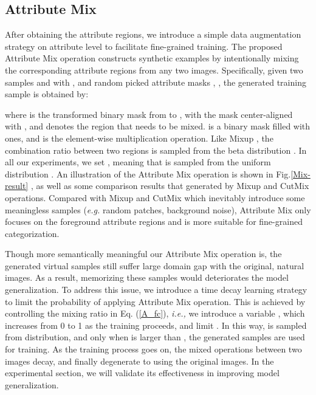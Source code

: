 \documentclass[runningheads]{llncs}
\begin{document}
\subsection{Attribute Mix}
\noindent After obtaining the attribute regions, we introduce a simple data augmentation strategy on attribute level to facilitate fine-grained training. The proposed Attribute Mix operation constructs synthetic examples by intentionally mixing the corresponding attribute regions from any two images. Specifically, given two samples  and  with , and random picked attribute masks , , the generated training sample  is obtained by:


where  is the transformed binary mask from  to , with the mask center-aligned with , and denotes the region that needs to be mixed.  is a binary mask filled with ones, and  is the element-wise multiplication operation. Like Mixup \cite{zhang2017mixup}, the combination ratio  between two regions is sampled from the beta distribution . In all our experiments, we set , meaning that  is sampled from the uniform distribution . An illustration of the Attribute Mix operation is shown in Fig.\ref{Mix-result} , as well as some comparison results that generated by Mixup and CutMix operations. Compared with Mixup and CutMix which inevitably introduce some meaningless samples (\emph{e.g.} random patches, background noise), Attribute Mix only focuses on the foreground attribute regions and is more suitable for fine-grained categorization.

Though more semantically meaningful our Attribute Mix operation is, the generated virtual samples still suffer large domain gap with the original, natural images. As a result, memorizing these samples would deteriorates the model generalization. To address this issue, we introduce a time decay learning strategy to limit the probability of applying Attribute Mix operation. This is achieved by controlling the mixing ratio  in Eq. (\ref{A_fc}), \emph{i.e.,} we introduce a variable , which increases from 0 to 1 as the training proceeds, and limit . In this way,  is sampled from  distribution, and only when  is larger than , the generated samples are used for training.  As the training process goes on, the mixed operations between two images decay, and finally degenerate to using the original images. In the experimental section, we will validate its effectiveness in improving model generalization.
\end{document}
